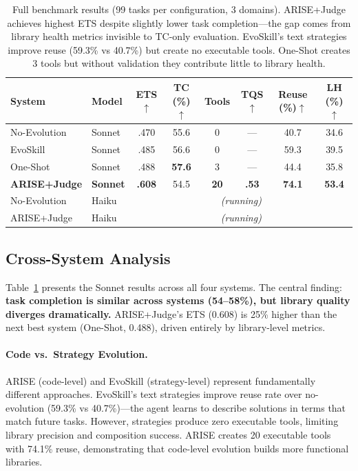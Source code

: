 \documentclass[10pt,twocolumn]{article}
\begin{document}
\begin{table}[t]
\centering
\footnotesize
\begin{tabular}{@{}llcccccc@{}}
\toprule
\textbf{System} & \textbf{Model} & \textbf{ETS}$\uparrow$ & \textbf{TC (\%)}$\uparrow$ & \textbf{Tools} & \textbf{TQS}$\uparrow$ & \textbf{Reuse (\%)}$\uparrow$ & \textbf{LH (\%)}$\uparrow$ \\
\midrule
No-Evolution & Sonnet & .470 & 55.6 & 0 & --- & 40.7 & 34.6 \\
EvoSkill & Sonnet & .485 & 56.6 & 0 & --- & 59.3 & 39.5 \\
One-Shot & Sonnet & .488 & \textbf{57.6} & 3 & --- & 44.4 & 35.8 \\
\textbf{ARISE+Judge} & \textbf{Sonnet} & \textbf{.608} & 54.5 & \textbf{20} & \textbf{.53} & \textbf{74.1} & \textbf{53.4} \\
\midrule
No-Evolution & Haiku & \multicolumn{6}{c}{\textit{(running)}} \\
ARISE+Judge & Haiku & \multicolumn{6}{c}{\textit{(running)}} \\
\bottomrule
\end{tabular}
\caption{Full benchmark results (99 tasks per configuration, 3 domains). ARISE+Judge achieves highest ETS despite slightly lower task completion---the gap comes from library health metrics invisible to TC-only evaluation. EvoSkill's text strategies improve reuse (59.3\% vs 40.7\%) but create no executable tools. One-Shot creates 3 tools but without validation they contribute little to library health.}
\label{tab:results_full}
\end{table}

\subsection{Cross-System Analysis}

Table~\ref{tab:results_full} presents the Sonnet results across all four systems. The central finding: \textbf{task completion is similar across systems (54--58\%), but library quality diverges dramatically.} ARISE+Judge's ETS (0.608) is 25\% higher than the next best system (One-Shot, 0.488), driven entirely by library-level metrics.

\paragraph{Code vs.\ Strategy Evolution.} ARISE (code-level) and EvoSkill (strategy-level) represent fundamentally different approaches. EvoSkill's text strategies improve reuse rate over no-evolution (59.3\% vs 40.7\%)---the agent learns to describe solutions in terms that match future tasks. However, strategies produce zero executable tools, limiting library precision and composition success. ARISE creates 20 executable tools with 74.1\% reuse, demonstrating that code-level evolution builds more functional libraries.
\end{document}
